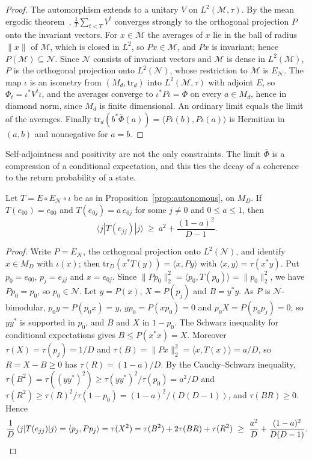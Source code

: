 \begin{proof}
The automorphism extends to a unitary $V$ on $L^2(\mathcal M,\tau)$. By the mean ergodic theorem~\cite{Krengel1985}, $\frac1T\sum_{t<T}V^t$ converges
strongly to the orthogonal projection $P$ onto the invariant vectors. For $x\in\mathcal M$ the averages of $x$ lie in the ball of radius $\|x\|$ of
$\mathcal M$, which is closed in $L^2$, so $Px\in\mathcal M$, and $Px$ is invariant; hence $P(\mathcal M)\subseteq\mathcal N$. Since
$\mathcal N$ consists of invariant vectors and $\mathcal M$ is dense in $L^2(\mathcal M)$, $P$ is the orthogonal projection onto
$L^2(\mathcal N)$, whose restriction to $\mathcal M$ is $E_{\mathcal N}$. The map $\iota$ is an isometry from $(M_d,\mathrm{tr}_d)$ into
$L^2(\mathcal M,\tau)$ with adjoint $E$, so $\Phi_t=\iota^*V^t\iota$, and the averages converge to $\iota^*P\iota=\overline\Phi$ on every $a\in M_d$,
hence in diamond norm, since $M_d$ is finite dimensional. An ordinary limit equals the limit of the averages. Finally
$\mathrm{tr}_d(b^*\overline\Phi(a))=\langle P\iota(b),P\iota(a)\rangle$ is Hermitian in $(a,b)$ and nonnegative for $a=b$.
\end{proof}

Self-adjointness and positivity are not the only constraints. The limit $\overline\Phi$ is a compression of a conditional expectation, and this ties
the decay of a coherence to the return probability of a state.

\begin{proposition}\label{prop:return}
Let $T=E\circ E_{\mathcal N}\circ\iota$ be as in Proposition~\ref{prop:autonomous}, on $M_D$. If $T(e_{00})=e_{00}$ and $T(e_{0j})=a\,e_{0j}$ for some
$j\ne0$ and $0\le a\le1$, then
\[
\langle j|T(e_{jj})|j\rangle\ \ge\ a^2+\frac{(1-a)^2}{D-1}.
\]
\end{proposition}

\begin{proof}
Write $P=E_{\mathcal N}$, the orthogonal projection onto $L^2(\mathcal N)$, and identify $x\in M_D$ with $\iota(x)$; then
$\mathrm{tr}_D(x^*T(y))=\langle x,Py\rangle$ with $\langle x,y\rangle=\tau(x^*y)$. Put $p_0=e_{00}$, $p_j=e_{jj}$ and $x=e_{0j}$. Since
$\|Pp_0\|_2^2=\langle p_0,T(p_0)\rangle=\|p_0\|_2^2$, we have $Pp_0=p_0$, so $p_0\in\mathcal N$. Let $y=P(x)$, $X=P(p_j)$ and $B=y^*y$. As $P$ is
$\mathcal N$-bimodular, $p_0y=P(p_0x)=y$, $yp_0=P(xp_0)=0$ and $p_0X=P(p_0p_j)=0$; so $yy^*$ is supported in $p_0$, and $B$ and $X$ in $1-p_0$. The
Schwarz inequality for conditional expectations gives $B\le P(x^*x)=X$. Moreover $\tau(X)=\tau(p_j)=1/D$ and $\tau(B)=\|Px\|_2^2=\langle x,T(x)\rangle=a/D$,
so $R=X-B\ge0$ has $\tau(R)=(1-a)/D$. By the Cauchy--Schwarz inequality, $\tau(B^2)=\tau((yy^*)^2)\ge\tau(yy^*)^2/\tau(p_0)=a^2/D$ and
$\tau(R^2)\ge\tau(R)^2/\tau(1-p_0)=(1-a)^2/(D(D-1))$, and $\tau(BR)\ge0$. Hence
\[
\frac1D\,\langle j|T(e_{jj})|j\rangle=\langle p_j,Pp_j\rangle=\tau(X^2)=\tau(B^2)+2\tau(BR)+\tau(R^2)\ \ge\ \frac{a^2}D+\frac{(1-a)^2}{D(D-1)} .\qedhere
\]
\end{proof}


